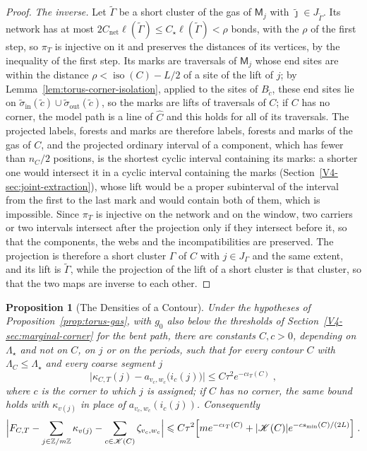 \documentclass[11pt]{article}
\newcommand{\iso}{\operatorname{iso}}
\numberwithin{equation}{section}
\newtheorem{proposition}[theorem]{Proposition}
\theoremstyle{remark}
\theoremstyle{plain}
\begin{document}
\begin{proof}
\emph{The inverse.} Let $\widetilde\Gamma$ be a short cluster of the gas of $\mathsf M_j$ with $\tilde\jmath\in J_{\widetilde\Gamma}$. Its network has at most $2C_{\mathrm{net}}\ell(\widetilde\Gamma)\leqslant C_{\star}\ell(\widetilde\Gamma)<\rho$ bonds, with the $\rho$ of the first step, so $\pi_T$ is injective on it and preserves the distances of its vertices, by the inequality of the first step. Its marks are traversals of $\mathsf M_j$ whose end sites are within the distance $\rho<\iso(C)-L/2$ of a site of the lift of $j$; by Lemma~\ref{lem:torus-corner-isolation}, applied to the sites of $B_{\tilde c}$, these end sites lie on $\tilde\sigma_{\mathrm{in}}(\tilde c)\cup\tilde\sigma_{\mathrm{out}}(\tilde c)$, so the marks are lifts of traversals of $C$; if $C$ has no corner, the model path is a line of $\widehat C$ and this holds for all of its traversals. The projected labels, forests and marks are therefore labels, forests and marks of the gas of $C$, and the projected ordinary interval of a component, which has fewer than $n_C/2$ positions, is the shortest cyclic interval containing its marks: a shorter one would intersect it in a cyclic interval containing the marks (Section~\ref{V4-sec:joint-extraction}), whose lift would be a proper subinterval of the interval from the first to the last mark and would contain both of them, which is impossible. Since $\pi_T$ is injective on the network and on the window, two carriers or two intervals intersect after the projection only if they intersect before it, so that the components, the webs and the incompatibilities are preserved. The projection is therefore a short cluster $\Gamma$ of $C$ with $j\in J_{\Gamma}$ and the same extent, and its lift is $\widetilde\Gamma$, while the projection of the lift of a short cluster is that cluster, so that the two maps are inverse to each other.
\end{proof}

\begin{proposition}[The Densities of a Contour]\label{prop:torus-densities}
Under the hypotheses of Proposition~\ref{prop:torus-gas}, with $g_0$ also below the thresholds of Section~\ref{V4-sec:marginal-corner} for the bent path, there are constants $C,c>0$, depending on $\Lambda_{\star}$ and not on $C$, on $j$ or on the periods, such that for every contour $C$ with $\Lambda_C\leqslant \Lambda_{\star}$ and every coarse segment $j$
\begin{equation}\label{eq:torus-density}
    \bigl|\kappa_{C,T}(j)-a_{v_c,w_c}\bigl(i_c(j)\bigr)\bigr|\leqslant C\tau^2e^{-c\iota_T(C)}\;,
\end{equation}
where $c$ is the corner to which $j$ is assigned; if $C$ has no corner, the same bound holds with $\kappa_{v(j)}$ in place of $a_{v_c,w_c}(i_c(j))$. Consequently
\begin{equation}\label{eq:torus-flat}
    \Bigl| F_{C,T}-\sum_{j\in\mathbb Z/m\mathbb Z}\kappa_{v(j)}-\sum_{c\in\mathscr K(C)}\zeta_{v_c,w_c}\Bigr|
        \leqslant C\tau^2\Bigl[me^{-c\iota_T(C)}+|\mathscr K(C)|e^{-cs_{\min}(C)/(2L)}\Bigr]\;.
\end{equation}
\end{proposition}
\end{document}
